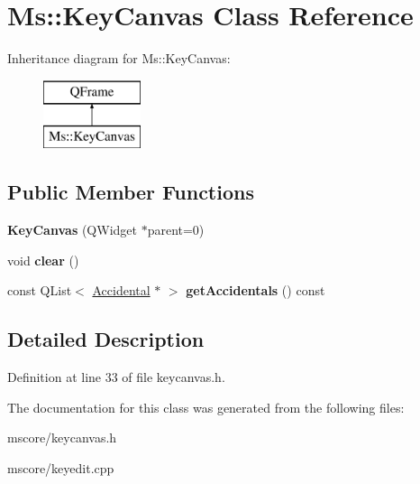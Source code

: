 \hypertarget{class_ms_1_1_key_canvas}{}\section{Ms\+:\+:Key\+Canvas Class Reference}
\label{class_ms_1_1_key_canvas}
Inheritance diagram for Ms\+:\+:Key\+Canvas\+:\begin{figure}[H]
\begin{center}
\leavevmode
\includegraphics[height=2.000000cm]{class_ms_1_1_key_canvas}
\end{center}
\end{figure}
\subsection*{Public Member Functions}
\begin{DoxyCompactItemize}
\item 
\mbox{\label{class_ms_1_1_key_canvas_a4c46ca329396df8bd04dcb45053b5d29}} 
{\bfseries Key\+Canvas} (Q\+Widget $\ast$parent=0)
\item 
\mbox{\label{class_ms_1_1_key_canvas_a0673dbc72598a25abeaeae71c70922ac}} 
void {\bfseries clear} ()
\item 
\mbox{\label{class_ms_1_1_key_canvas_a7213bbe8572b1e7fa949f4f1ec627683}} 
const Q\+List$<$ \hyperlink{class_ms_1_1_accidental}{Accidental} $\ast$ $>$ {\bfseries get\+Accidentals} () const
\end{DoxyCompactItemize}


\subsection{Detailed Description}


Definition at line 33 of file keycanvas.\+h.



The documentation for this class was generated from the following files\+:\begin{DoxyCompactItemize}
\item 
mscore/keycanvas.\+h\item 
mscore/keyedit.\+cpp\end{DoxyCompactItemize}
